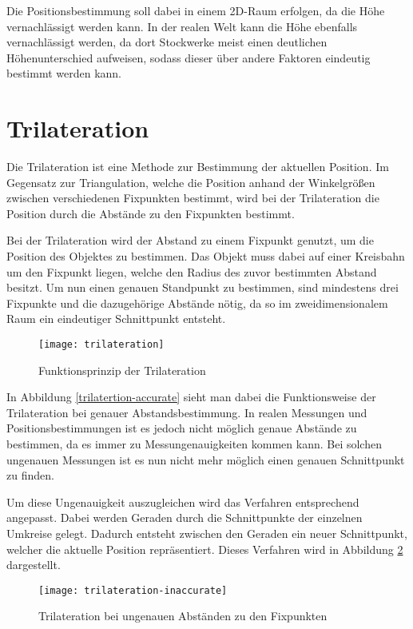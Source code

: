 Die Positionsbestimmung soll dabei in einem 2D-Raum erfolgen, da die Höhe vernachlässigt werden kann. In der realen Welt kann die Höhe ebenfalls vernachlässigt werden, da dort Stockwerke meist einen deutlichen Höhenunterschied aufweisen, sodass dieser über andere Faktoren eindeutig bestimmt werden kann.


\section{Trilateration}
\label{sec:implementation:trilateration}
Die Trilateration ist eine Methode zur Bestimmung der aktuellen Position. Im Gegensatz zur Triangulation, welche die Position anhand der Winkelgrößen zwischen verschiedenen Fixpunkten bestimmt, wird bei der Trilateration die Position durch die Abstände zu den Fixpunkten bestimmt. 

Bei der Trilateration wird der Abstand zu einem Fixpunkt genutzt, um die Position des Objektes zu bestimmen. Das Objekt muss dabei auf einer Kreisbahn um den Fixpunkt liegen, welche den Radius des zuvor bestimmten Abstand besitzt. Um nun einen genauen Standpunkt zu bestimmen, sind mindestens drei Fixpunkte und die dazugehörige Abstände nötig, da so im zweidimensionalem Raum ein eindeutiger Schnittpunkt entsteht.

\begin{figure}[htb!]
	\centering
	\texttt{[image: trilateration]}
	\caption{Funktionsprinzip der Trilateration}
	\label{trilateration-accurate}
\end{figure}

In Abbildung \ref{trilatertion-accurate} sieht man dabei die Funktionsweise der Trilateration bei genauer Abstandsbestimmung. In realen Messungen und Positionsbestimmungen ist es jedoch nicht möglich genaue Abstände zu bestimmen, da es immer zu Messungenauigkeiten kommen kann.
Bei solchen ungenauen Messungen ist es nun nicht mehr möglich einen genauen Schnittpunkt zu finden. 

Um diese Ungenauigkeit auszugleichen wird das Verfahren entsprechend angepasst. Dabei werden Geraden durch die Schnittpunkte der einzelnen Umkreise gelegt. Dadurch entsteht zwischen den Geraden ein neuer Schnittpunkt, welcher die aktuelle Position repräsentiert. Dieses Verfahren wird in Abbildung \ref{trilateration-inaccurate} dargestellt.

\begin{figure}[htb!]
		\centering
	\texttt{[image: trilateration-inaccurate]}
	\caption{Trilateration bei ungenauen Abständen zu den Fixpunkten}
	\label{trilateration-inaccurate}
\end{figure}

